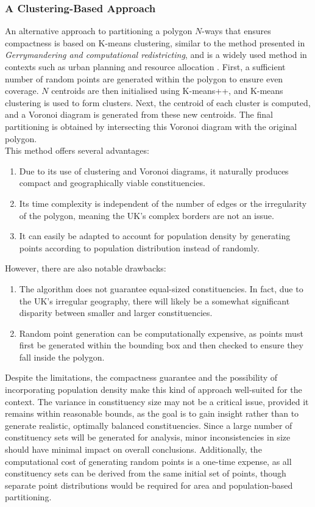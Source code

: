 \documentclass{article}
\begin{document}
\subsubsection{A Clustering-Based Approach}

An alternative approach to partitioning a polygon $N$-ways that ensures compactness is based on K-means clustering, similar to the method presented in \textit{Gerrymandering and computational redistricting},
and is a widely used method in contexts such as urban planning and resource allocation \cite{voronoi}. First, a sufficient number of random points are generated within the polygon to ensure even coverage.
$N$ centroids are then initialised using K-means++, and K-means clustering is used to form clusters. Next, the centroid of each cluster is computed, and a Voronoi diagram is generated from these
new centroids. The final partitioning is obtained by intersecting this Voronoi diagram with the original polygon.\\

This method offers several advantages:
\begin{enumerate}
    \item Due to its use of clustering and Voronoi diagrams, it naturally produces compact and geographically viable constituencies.
    \item Its time complexity is independent of the number of edges or the irregularity of the polygon, meaning the UK's complex borders are not an issue.
    \item It can easily be adapted to account for population density by generating points according to population distribution instead of randomly.
\end{enumerate}

However, there are also notable drawbacks:
\begin{enumerate}
    \item The algorithm does not guarantee equal-sized constituencies. In fact, due to the UK's irregular geography, there will likely be a somewhat significant disparity between smaller and larger constituencies.
    \item Random point generation can be computationally expensive, as points must first be generated within the bounding box and then checked to ensure they fall inside the polygon.
\end{enumerate}

Despite the limitations, the compactness guarantee and the possibility of incorporating population density make this kind of approach well-suited for the context. The variance in constituency size may not
be a critical issue, provided it remains within reasonable bounds, as the goal is to gain insight rather than to generate realistic, optimally balanced constituencies. Since a large number of
constituency sets will be generated for analysis, minor inconsistencies in size should have minimal impact on overall conclusions. Additionally, the computational cost of generating random points
is a one-time expense, as all constituency sets can be derived from the same initial set of points, though separate point distributions would be required for area and population-based partitioning.
\end{document}
